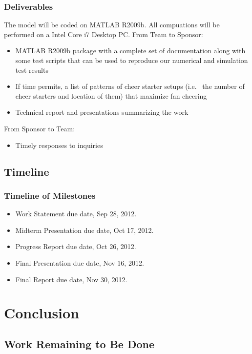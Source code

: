 \documentclass[compress,handout,10pt]{beamer}
\let\olditem\item
\renewcommand{\item}{\setlength{\itemsep}{0.5\baselineskip}\olditem}
\begin{document}
\begin{frame}
	\frametitle{Deliverables}
	The model will be coded on MATLAB R2009b. All compuations will be performed on a Intel Core i7 Desktop PC.
	From Team to Sponsor:
	\begin {itemize}
	\item MATLAB R2009b package with a complete set of documentation along with some test scripts that can be used to reproduce our numerical and simulation test results
	\item If time permits, a list of patterns of cheer starter setups (i.e.~ the number of cheer starters and location of them) that maximize fan cheering
	\item Technical report and presentations summarizing the work
	\end{itemize}
	From Sponsor to Team:
	\begin{itemize}
		\item Timely responses to inquiries
	\end{itemize}
\end{frame}

\subsection{Timeline}

\begin{frame}
	\frametitle{Timeline of Milestones}
	\begin{itemize}
    \item Work Statement due date, Sep 28, 2012.
    \item Midterm Presentation due date, Oct 17, 2012.
    \item Progress Report due date, Oct 26, 2012.
    \item Final Presentation due date, Nov 16, 2012.
    \item Final Report due date, Nov 30, 2012.
	\end{itemize}
\end{frame}

\section{Conclusion}

\subsection{Work Remaining to Be Done}

\end{document}
